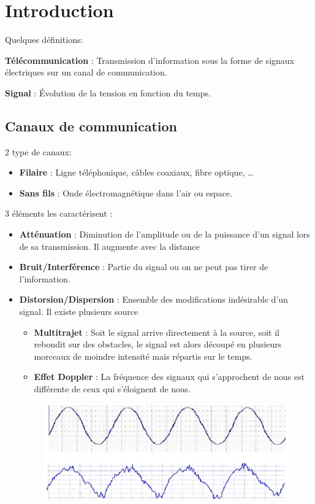 \section{Introduction}
Quelques définitions:

\textbf{Télécommunication} : Transmission d'information sous la forme de signaux électriques sur un canal de communication.

\textbf{Signal} : Évolution de la tension en fonction du temps.

	\subsection{Canaux de communication}
		2 type de canaux:
		\begin{itemize}
			\item \textbf{Filaire} : Ligne téléphonique, câbles coaxiaux, fibre optique, \dots
			\item \textbf{Sans fils} : Onde électromagnétique dans l'air ou espace.
		\end{itemize}
		
		3 éléments les caractérisent :
		\begin{itemize}
			\item \textbf{Atténuation} : Diminution de l'amplitude ou de la puissance d'un signal lors de sa transmission. Il augmente avec la distance
			\item \textbf{Bruit/Interférence} : Partie du signal ou on ne peut pas tirer de l'information.
			\item  \textbf{Distorsion/Dispersion} : Ensemble des modifications indésirable d'un signal. Il existe plusieurs source
			\begin{itemize}
				\item \textbf{Multitrajet} : Soit le signal arrive directement à la source, soit il rebondit sur des obstacles, le signal est alors découpé en plusieurs morceaux de moindre intensité mais répartis sur le temps.
				\item \textbf{Effet Doppler} : La fréquence des signaux qui s'approchent de nous est différente de ceux qui s'éloignent de nous.
			\end{itemize}
			
			\begin{figure}[H]
				\centering
				\includegraphics[width=\textwidth]{img/Distortion.png}
			\end{figure}
		\end{itemize}
	
